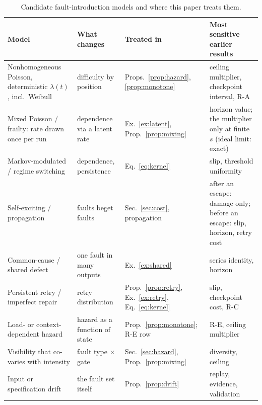 \documentclass[11pt]{article}
\theoremstyle{definition}
\theoremstyle{remark}
\begin{document}
\begin{table}[h]\centering\small
\caption{Candidate fault-introduction models and where this paper treats them.}\label{tab:catalog}
\begin{tabular}{>{\raggedright\arraybackslash}p{}>{\raggedright\arraybackslash}p{}>{\raggedright\arraybackslash}p{}>{\raggedright\arraybackslash}p{}}
\toprule Model & What changes & Treated in & Most sensitive earlier results\\\midrule
Nonhomogeneous Poisson, deterministic $\lambda(t)$, incl.\ Weibull~\cite{goel} & difficulty by position
 & Props.~\ref{prop:hazard}, \ref{prop:monotone} & ceiling multiplier, checkpoint interval, R-A\\
Mixed Poisson / frailty: rate drawn once per run~\cite{vaupel} & dependence via a latent rate
 & Ex.~\ref{ex:latent}, Prop.~\ref{prop:mixing} & horizon value; the multiplier only at finite $s$ (ideal limit: exact)\\
Markov-modulated / regime switching~\cite{mmpp} & dependence, persistence
 & Eq.~\eqref{eq:kernel} & slip, threshold uniformity\\
Self-exciting / propagation~\cite{hawkes} & faults beget faults
 & Sec.~\ref{sec:cost}, propagation & after an escape: damage only; before an escape: slip, horizon, retry cost\\
Common-cause / shared defect & one fault in many outputs
 & Ex.~\ref{ex:shared} & series identity, horizon\\
Persistent retry / imperfect repair~\cite{brownproschan} & retry distribution
 & Prop.~\ref{prop:retry}, Ex.~\ref{ex:retry}, Eq.~\eqref{eq:kernel} & slip, checkpoint cost, R-C\\
Load- or context-dependent hazard & hazard as a function of state
 & Prop.~\ref{prop:monotone}; R-E row & R-E, ceiling multiplier\\
Visibility that co-varies with intensity & fault type $\times$ gate
 & Sec.~\ref{sec:hazard}, Prop.~\ref{prop:mixing} & diversity, ceiling\\
Input or specification drift & the fault set itself
 & Prop.~\ref{prop:drift} & replay, evidence, validation\\
\bottomrule
\end{tabular}
\end{table}
\end{document}
